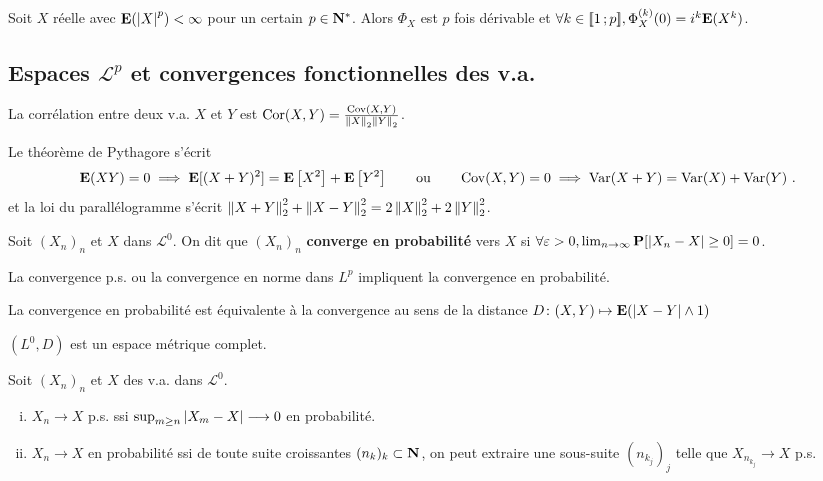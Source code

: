 	\begin{pop}
		Soit $X$ réelle avec $\mathbf{E}(\left\lvert X\right\rvert^p) < \infty$ pour un certain $p \in \mathbf{N}^*$.
		Alors $\Phi_X$ est $p$ fois dérivable et $\forall k \in \mathopen{[\![}1\mathclose{}\mathpunct{};p\mathclose{]\!]}, \Phi_X^{(k)}(0) = i^k \mathbf{E}(X^k)$.
	\end{pop}



\subsection{Espaces $\mathcal{L}^p$ et convergences fonctionnelles des v.a.}

	La corrélation entre deux v.a. $X$ et $Y$ est $\operatorname{Cor}(X,Y) = \frac{\operatorname{Cov}(X,Y)}{\left\lVert X\right\rVert_2 \left\lVert Y\right\rVert_2}$.
	
	Le théorème de Pythagore s'écrit
	$$\esp(XY) = 0 \implies \esp[(X + Y)^2] = \esp \left[ X^2 \right] + \esp \left[ Y^2 \right]
		\qquad \text{ou} \qquad
		\Cov(X,Y) = 0 \implies \Var(X + Y) = \Var(X) + \Var(Y)\ .$$
	et la loi du parallélogramme s'écrit $\left\lVert X + Y\right\rVert_2^2 + \left\lVert X - Y\right\rVert_2^2 = 2 \left\lVert X\right\rVert_2^2 + 2 \left\lVert Y\right\rVert_2^2$.

	
	\begin{defn}
		Soit $(X_n)_n$ et $X$ dans $\mathcal{L}^0$.
		On dit que $(X_n)_n$ \textbf{converge en probabilité} vers $X$ si $\forall \varepsilon > 0, \lim_{n \to \infty} \mathbf{P}[\left\lvert X_n - X\right\rvert \geq 0] = 0$.
	\end{defn}

	\begin{lem}
		La convergence p.s. ou la  convergence en norme dans $L^p$ impliquent la convergence en probabilité.
	\end{lem}

	\begin{lem}
		La convergence en probabilité est équivalente à la convergence au sens de la distance $D \colon (X,Y) \mapsto \mathbf{E}(\left\lvert X - Y\right\rvert \wedge 1)$
	\end{lem}
	
	\begin{thm}
		$(L^0,D)$ est un espace métrique complet.
	\end{thm}

	\begin{thm}
		Soit $(X_n)_n$ et $X$ des v.a. dans $\mathcal{L}^0$.
		\begin{enumerate}[(i)]
			\item $X_n \longrightarrow X$ p.s. ssi $\sup_{m \geq n} \left\lvert X_m - X\right\rvert \longrightarrow 0$ en probabilité.
			\item $X_n \longrightarrow X$ en probabilité ssi de toute suite croissantes $(n_k)_k \subset \mathbf{N}$, on peut extraire une sous-suite $(n_{k_j})_j$ telle que $X_{n_{k_j}} \longrightarrow X$ p.s.
		\end{enumerate}
	\end{thm}

